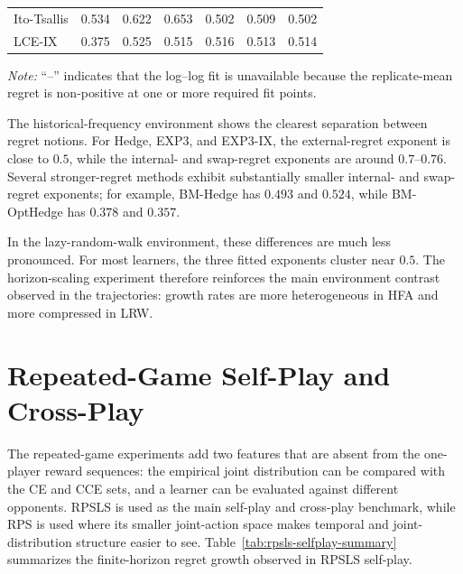 \begin{table}[H]
\begin{tabular}{lcccccc}
        Ito-Tsallis
        & 0.534 & 0.622 & 0.653
        & 0.502 & 0.509 & 0.502 \\

        LCE-IX
        & 0.375 & 0.525 & 0.515
        & 0.516 & 0.513 & 0.514 \\

        \bottomrule
    \end{tabular}

    \vspace{0.5em}
    \begin{minipage}{0.95\textwidth}
        \footnotesize
        \textit{Note:} ``--'' indicates that the log--log fit is unavailable
        because the replicate-mean regret is non-positive at one or more
        required fit points.
    \end{minipage}
\end{table}


The historical-frequency environment shows the clearest separation between
regret notions. For Hedge, EXP3, and EXP3-IX, the external-regret exponent is
close to \(0.5\), while the internal- and swap-regret exponents are around
\(0.7\)--\(0.76\). Several stronger-regret methods exhibit substantially
smaller internal- and swap-regret exponents; for example, BM-Hedge has
\(0.493\) and \(0.524\), while BM-OptHedge has \(0.378\) and \(0.357\).

In the lazy-random-walk environment, these differences are much less
pronounced. For most learners, the three fitted exponents cluster near
\(0.5\). The horizon-scaling experiment therefore reinforces the main
environment contrast observed in the trajectories: growth rates are more
heterogeneous in HFA and more compressed in LRW.


\section{Repeated-Game Self-Play and Cross-Play}
\label{sec:self-play-results}

The repeated-game experiments add two features that are absent from the
one-player reward sequences: the empirical joint distribution can be compared
with the CE and CCE sets, and a learner can be evaluated against different
opponents. RPSLS is used as the main self-play and cross-play benchmark, while
RPS is used where its smaller joint-action space makes temporal and
joint-distribution structure easier to see. Table~\ref{tab:rpsls-selfplay-summary}
summarizes the finite-horizon regret growth observed in RPSLS self-play.

